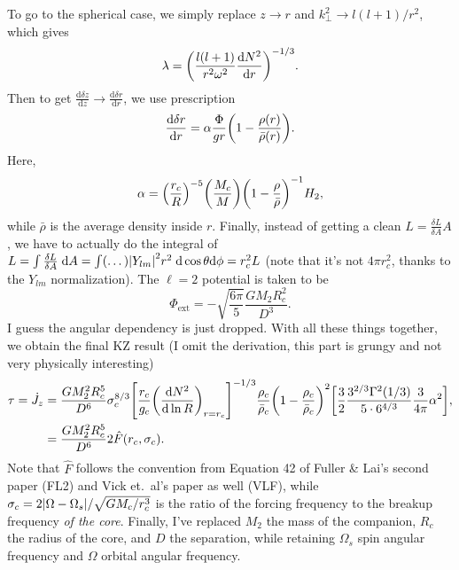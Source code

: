 \documentclass[11pt,
        usenames, %
        dvipsnames %
    ]{article}
\newcommand*{\rd}[2]{\frac{\mathrm{d}#1}{\mathrm{d}#2}}
\DeclarePairedDelimiter\abs{\lvert}{\rvert}
\DeclarePairedDelimiter\p{\lparen}{\rparen}
\DeclarePairedDelimiter\s{\lbrack}{\rbrack}
\begin{document}
To go to the spherical case, we simply replace $z \to r$ and $k_\perp^2 \to l(l
+ 1)/r^2$, which gives
\begin{equation}
    \lambda = \p*{\frac{l(l + 1)}{r^2\omega^2} \rd{N^2}{r}}^{-1/3}.
\end{equation}
Then to get $\rd{\delta z}{z} \to \rd{\delta r}{r}$, we use prescription
\begin{equation}
    \rd{\delta r}{r} = \alpha \frac{\Phi}{gr}
        \p*{1 - \frac{\rho(r)}{\bar{\rho}(r)}}.
\end{equation}
Here,
\begin{equation}
    \alpha = \p*{\frac{r_c}{R}}^{-5}\p*{\frac{M_c}{M}}\p*{1 -
        \frac{\rho}{\bar{\rho}}}^{-1}H_2,
\end{equation}
while $\bar{\rho}$ is the average density inside $r$. Finally, instead of
getting a clean $L = \frac{\delta L}{\delta A}A$, we have to actually do the
integral of $L = \int \frac{\delta L}{\delta A}\;\mathrm{d}A = \int (\dots)
\abs*{Y_{lm}}^2 r^2 \;\mathrm{d}\cos\theta \mathrm{d}\phi = r_c^2 L$ (note that
it's not $4\pi r_c^2$, thanks to the $Y_{lm}$ normalization). The $\ell = 2$
potential is taken to be
\begin{equation}
    \Phi_{\mathrm{ext}} = -\sqrt{\frac{6\pi}{5}}\frac{GM_2R_c^2}{D^3}.
\end{equation}
I guess the angular dependency is just dropped. With all these things together,
we obtain the final KZ result (I omit the derivation, this part is grungy and
not very physically interesting)
\begin{align}
    \tau = \dot{J}_z &= \frac{GM_2^2R_c^5}{D^6} \sigma_c^{8/3}
        \s*{\frac{r_c}{g_c}\p*{\rd{N^2}{\ln R}}_{r = r_c}}^{-1/3}
            \frac{\rho_c}{\bar{\rho}_c} \p*{1 - \frac{\rho_c}{\bar{\rho}_c}}^2
            \s*{\frac{3}{2}\frac{3^{2/3}\Gamma^2(1/3)}{5 \cdot
                6^{4/3}} \frac{3}{4\pi}\alpha^2},\\
        &= \frac{GM_2^2R_c^5}{D^6}2\hat{F}\p*{r_c, \sigma_c}.
            \label{eq:tau_fhat}
\end{align}
Note that $\hat{F}$ follows the convention from Equation 42 of Fuller \& Lai's
second paper (FL2) and Vick et.\ al's paper as well (VLF), while $\sigma_c =
2\abs*{\Omega - \Omega_s} / \sqrt{GM_c / r_c^3}$ is the ratio of the forcing
frequency to the breakup frequency \emph{of the core}. Finally, I've replaced
$M_2$ the mass of the companion, $R_c$ the radius of the core, and $D$ the
separation, while retaining $\Omega_s$ spin angular frequency and $\Omega$
orbital angular frequency.
\end{document}
